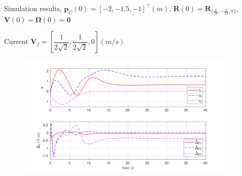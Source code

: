 \documentclass{beamer}
\begin{document}
\begin{frame}{Simulation results, \tiny$\mathbf{p}_C(0) = [-2, -1.5, -1 ]^{\top} (m)$, $\mathbf{R}(0) = \mathbf{R}_{\{\frac{\pi}{18},-\frac{\pi}{18},\pi\}}$, $\mathbf{V}(0) = \mathbf{\Omega}(0) = \mathbf{0}$}

\begin{block}{Current $\mathbf{V}_f = [\dfrac{1}{2\sqrt{2}}, \dfrac{1}{2\sqrt{2}}, 0] (m/s)$}
	\begin{figure}
		\includegraphics[width = 105mm]{Images/Data_avecCurrent_zep_hatDeltaG2.pdf}	
	\end{figure}
\end{block}
\end{frame}


%
%    
%    
%
% 
%    
%
\end{document}
